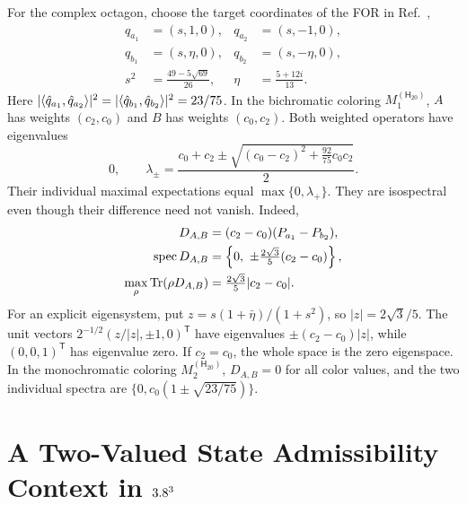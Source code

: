 \documentclass[aps,pra,reprint,superscriptaddress,longbibliography,nofootinbib,floatfix,10pt]{revtex4-2}
\theoremstyle{definition}\newtheorem{definition}[theorem]{Definition}
\theoremstyle{remark}\newtheorem{remark}[theorem]{Remark}
\newcommand{\Htwenty}{\mathsf H_{20}}
\begin{document}
For the complex octagon, choose the target coordinates of the FOR in Ref.~\cite{2026-Navara-Svozil-complex-only-3d-hypergraphs},
\begin{equation}\label{eq:weighted-octagon-rays}
\begin{aligned}
q_{a_1}&=(s,1,0),&q_{a_2}&=(s,-1,0),\\
q_{b_1}&=(s,\eta,0),&q_{b_2}&=(s,-\eta,0),\\
s^2&=\frac{49-5\sqrt{69}}{26},&\eta&=\frac{5+12i}{13}.
\end{aligned}
\end{equation}
Here $|\langle \hat q_{a_1},\hat q_{a_2}\rangle|^2=|\langle \hat q_{b_1},\hat q_{b_2}\rangle|^2=23/75$. In the bichromatic coloring $M_1^{(\Htwenty)}$, $A$ has weights $(c_2,c_0)$ and $B$ has weights $(c_0,c_2)$. Both weighted operators have eigenvalues
\begin{equation}\label{eq:weighted-octagon-spectrum}
0,\qquad \lambda_\pm=\frac{c_0+c_2\pm
\sqrt{(c_0-c_2)^2+\tfrac{92}{75}c_0c_2}}{2}.
\end{equation}
Their individual maximal expectations equal $\max\{0,\lambda_+\}$. They are isospectral even though their difference need not vanish. Indeed,
\begin{equation}\label{eq:weighted-octagon-difference}
\begin{aligned}
D_{A,B}&=(c_2-c_0)(P_{a_1}-P_{b_2}),\\
\operatorname{spec}D_{A,B}&=\left\{0,\ \pm\tfrac{2\sqrt3}{5}(c_2-c_0)\right\},\\
\max_\rho\Tr(\rho D_{A,B})&=\tfrac{2\sqrt3}{5}|c_2-c_0|.
\end{aligned}
\end{equation}
For an explicit eigensystem, put $z=s(1+\bar\eta)/(1+s^2)$, so $|z|=2\sqrt3/5$. The unit vectors $2^{-1/2}(z/|z|,\pm1,0)^{\mathsf T}$ have eigenvalues $\pm(c_2-c_0)|z|$, while $(0,0,1)^{\mathsf T}$ has eigenvalue zero. If $c_2=c_0$, the whole space is the zero eigenspace. In the monochromatic coloring $M_2^{(\Htwenty)}$, $D_{A,B}=0$ for all color values, and the two individual spectra are $\{0,c_0(1\pm\sqrt{23/75})\}$.

\section{A Two-Valued State Admissibility Context in \texorpdfstring{$3.8^3$}{R3}}\label{sec:two-valued}
\end{document}
